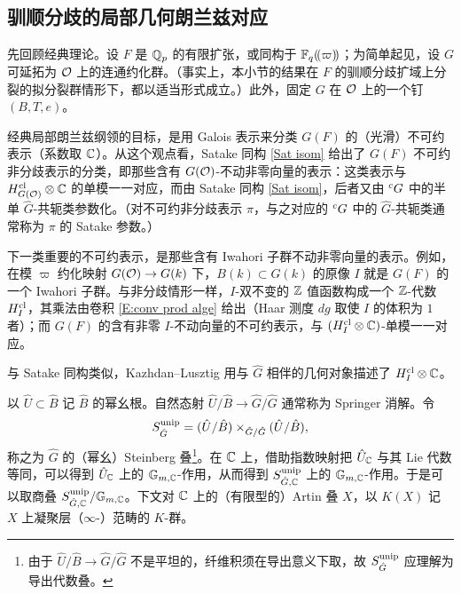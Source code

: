 
\subsection{驯顺分歧的局部几何朗兰兹对应}\label{Tamely local}

先回顾经典理论。设 $F$ 是 ${\mathbb Q}_p$ 的有限扩张，或同构于 ${\mathbb F}_q(\!(\varpi)\!)$；为简单起见，设 $G$ 可延拓为 ${\mathcal O}$ 上的连通约化群。（事实上，本小节的结果在 $F$ 的驯顺分歧扩域上分裂的拟分裂群情形下，都以适当形式成立。）此外，固定 $G$ 在 ${\mathcal O}$ 上的一个钉 $(B,T,e)$。

经典局部朗兰兹纲领的目标，是用 Galois 表示来分类 $G(F)$ 的（光滑）不可约表示（系数取 ${\mathbb C}$）。从这个观点看，Satake 同构 \eqref{Sat isom} 给出了 $G(F)$ 不可约非分歧表示的分类，即那些含有 $G({\mathcal O})$-不动非零向量的表示：这类表示与 $H^{{\operatorname{cl}}}_{G({\mathcal O})}\otimes{\mathbb C}$ 的单模一一对应，而由 Satake 同构 \eqref{Sat isom}，后者又由 ${}^cG$ 中的半单 $\hat{G}$-共轭类参数化。（对不可约非分歧表示 $\pi$，与之对应的 ${}^cG$ 中的 $\hat{G}$-共轭类通常称为 $\pi$ 的 Satake 参数。）

下一类重要的不可约表示，是那些含有 Iwahori 子群不动非零向量的表示。例如，在模 $\varpi$ 约化映射 $G({\mathcal O})\to G(k)$ 下，$B(k)\subset G(k)$ 的原像 $I$ 就是 $G(F)$ 的一个 Iwahori 子群。与非分歧情形一样，$I$-双不变的 ${\mathbb Z}$ 值函数构成一个 ${\mathbb Z}$-代数 $H^{{\operatorname{cl}}}_{I}$，其乘法由卷积 \eqref{E:conv prod alge} 给出（Haar 测度 $dg$ 取使 $I$ 的体积为 $1$ 者）；而 $G(F)$ 的含有非零 $I$-不动向量的不可约表示，与 $(H^{{\operatorname{cl}}}_I\otimes{\mathbb C})$-单模一一对应。

与 Satake 同构类似，Kazhdan--Lusztig 用与 $\hat{G}$ 相伴的几何对象描述了 $H^{{\operatorname{cl}}}_{I}\otimes{\mathbb C}$。

以 $\hat{U}\subset\hat{B}$ 记 $\hat{B}$ 的幂幺根。自然态射 $\hat{U}/\hat{B}\to \hat{G}/\hat{G}$ 通常称为 Springer 消解。令
\[
S^{{\operatorname{unip}}}_{\hat{G}}=(\hat{U}/\hat{B})\times_{\hat{G}/\hat{G}}(\hat{U}/\hat{B}),
\]
称之为 $\hat{G}$ 的（幂幺）Steinberg 叠\footnote{由于 $\hat{U}/\hat{B}\to \hat{G}/\hat{G}$ 不是平坦的，纤维积须在导出意义下取，故 $S^{{\operatorname{unip}}}_{\hat{G}}$ 应理解为导出代数叠。}。在 ${\mathbb C}$ 上，借助指数映射把 $\hat{U}_{\mathbb C}$ 与其 Lie 代数等同，可以得到 $\hat{U}_{\mathbb C}$ 上的 ${\mathbb G}_{m,{\mathbb C}}$-作用，从而得到 $S^{{\operatorname{unip}}}_{\hat{G},{\mathbb C}}$ 上的 ${\mathbb G}_{m,{\mathbb C}}$-作用。于是可以取商叠 $S^{{\operatorname{unip}}}_{\hat{G},{\mathbb C}}/{\mathbb G}_{m,{\mathbb C}}$。下文对 ${\mathbb C}$ 上的（有限型的）Artin 叠 $X$，以 $K(X)$ 记 $X$ 上凝聚层（$\infty$-）范畴的 $K$-群。

